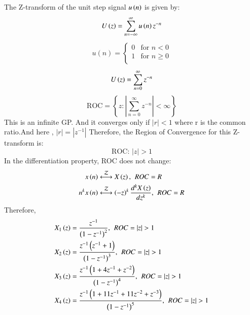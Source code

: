 \documentclass[journal,12pt,twocolumn]{IEEEtran}
\theoremstyle{remark}
\begin{document}
\begin{enumerate}[label=\arabic*.]
The Z-transform of the unit step signal $u\left(n\right)$ is given by:
\begin{equation}\label{eq:z_transform}
    U\left(z\right) = \sum_{n=-\infty}^{\infty} u\left(n\right) z^{-n}
\end{equation}
\begin{align}
    u(n) = \begin{cases}
        0 & \text{for } n < 0 \\
        1 & \text{for } n \geq 0\\
    \end{cases}
\end{align}
\begin{align}
    U\left(z\right) = \sum_{n=0}^{\infty} z^{-n}\label{eq:z_transform_simplified}
\end{align}
\begin{equation}
    \text{ROC} = \left\{ z : \left\lvert \sum_{n=0}^{\infty}z^{-n} \right\rvert < \infty \right\}
\end{equation}
This is an infinite GP. And it converges only if $|r|<1$ where r is the common ratio.And here , $|r|=|z^{-1}|$ Therefore,
the Region of Convergence  for this Z-transform is:
\begin{equation}
    \text{ROC: } |z| > 1
\end{equation}
In the differentiation property, ROC does not change:\\
\begin{align}
x\left(n\right) &\stackrel{\mathcal{Z}}{\longleftrightarrow} X\left(z\right),\hspace{4pt} ROC = R\\
n^k x\left(n\right) &\stackrel{\mathcal{Z}}{\longleftrightarrow} \left(-z\right)^k \frac{d^kX\left(z\right)}{dz^k},\hspace{4pt} ROC = R 
\end{align}
Therefore,
\begin{align}
    X_1\brak{z} &= \frac{z^{-1}}{\brak{1-z^{-1}}^2} , \hspace{4pt} ROC=|z|>1\\
    X_2\brak{z} &= \frac{z^{-1}\brak{z^{-1}+1}}{\brak{1-z^{-1}}^3} , \hspace{4pt} ROC=|z|>1\\
    X_3\brak{z} &= \frac{z^{-1}\brak{1+4z^{-1}+z^{-2}}}{\brak{1-z^{-1}}^4}, \hspace{4pt} ROC=|z|>1\\
    X_4\brak{z} &= \frac{z^{-1}\brak{1+11z^{-1}+11z^{-2}+z^{-3}}}{\brak{1-z^{-1}}^5}, \hspace{4pt} ROC=|z|>1

\end{align}
\end{enumerate}
\end{document}
